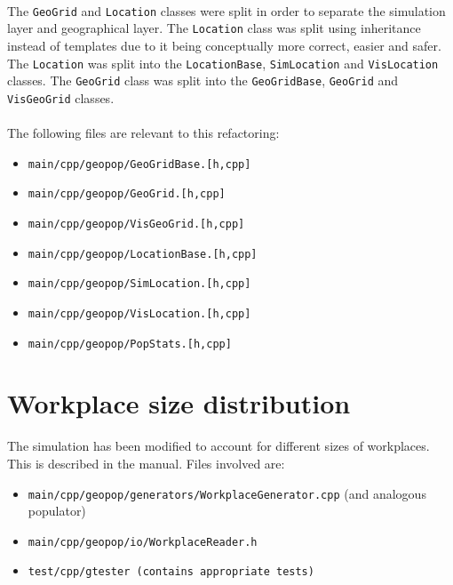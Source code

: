 \documentclass{article}
\begin{document}
\paragraph{} The \texttt{GeoGrid} and \texttt{Location} classes were split in order to separate the simulation layer and geographical layer. The \texttt{Location} class was split using inheritance instead of templates due to it being conceptually more correct, easier and safer. The \texttt{Location} was split into the \texttt{LocationBase}, \texttt{SimLocation} and \texttt{VisLocation} classes. The \texttt{GeoGrid} class was split into the \texttt{GeoGridBase}, \texttt{GeoGrid} and \texttt{VisGeoGrid} classes.

\paragraph{} The following files are relevant to this refactoring:
\begin{itemize}
\item \texttt{main/cpp/geopop/GeoGridBase.[h,cpp]}
\item \texttt{main/cpp/geopop/GeoGrid.[h,cpp]}
\item \texttt{main/cpp/geopop/VisGeoGrid.[h,cpp]}
\item \texttt{main/cpp/geopop/LocationBase.[h,cpp]}
\item \texttt{main/cpp/geopop/SimLocation.[h,cpp]}
\item \texttt{main/cpp/geopop/VisLocation.[h,cpp]}
\item \texttt{main/cpp/geopop/PopStats.[h,cpp]}
\end{itemize}

\section{Workplace size distribution}
The simulation has been modified to account for different sizes of workplaces. This is described in the manual. Files involved are:

\begin{itemize}
\item \texttt{main/cpp/geopop/generators/WorkplaceGenerator.cpp} (and analogous populator)
\item \texttt{main/cpp/geopop/io/WorkplaceReader.h}
\item \texttt{test/cpp/gtester (contains appropriate tests)}
\end{itemize}
\end{document}

